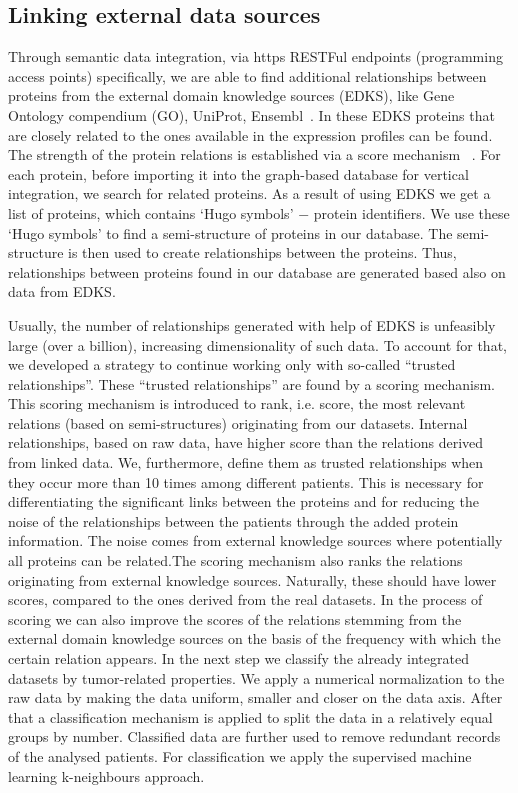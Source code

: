 \documentclass{bmcart}
\begin{document}
\subsection{Linking external data sources}

Through semantic data integration, via https RESTFul endpoints
(programming access points) specifically, we are able to find
additional relationships between proteins from the external domain
knowledge sources (EDKS), like Gene Ontology compendium (GO), UniProt,
Ensembl~\cite{11, 36, 37}. In these EDKS proteins that are closely related
to the ones available in the expression profiles can be found. The
strength of the protein relations is established via a score mechanism~\cite{11}
. For each protein, before importing it into the graph-based
database for vertical integration, we search for related proteins. As a
result of using EDKS we get a list of proteins, which contains
{\textquoteleft}Hugo symbols{\textquoteright} $-$ protein identifiers.
We use these {\textquoteleft}Hugo symbols{\textquoteright} to find a
semi-structure of proteins in our database. The semi-structure is then
used to create relationships between the proteins. Thus, relationships
between proteins found in our database are generated based also on data
from EDKS.

Usually, the number of relationships generated with help of EDKS is
unfeasibly large (over a billion), increasing dimensionality of such
data. To account for that,  we developed a strategy to continue working
only with so-called {\textquotedblleft}trusted
relationships{\textquotedblright}. These {\textquotedblleft}trusted
relationships{\textquotedblright} are found by a scoring mechanism.
This scoring mechanism is introduced to rank, i.e. score, the most
relevant relations (based on semi-structures) originating from our
datasets. Internal relationships, based on raw data, have higher score than the relations derived from linked data. We, furthermore, define them as trusted relationships when they occur more than 10 times among different patients. This is necessary for differentiating the significant links between the proteins and for reducing the noise of the relationships between the patients through the added protein information. The noise comes from external knowledge sources where potentially all proteins can be related.The scoring mechanism also ranks the relations originating from external knowledge sources. Naturally, these should have lower scores, compared to the ones derived from the real datasets. In the process of scoring we can also improve the scores of the relations stemming from the external domain knowledge sources on the basis of the frequency with which  the certain relation appears. In the next step we classify the already integrated datasets by tumor-related properties.
We apply a numerical normalization to the raw data by making the data uniform, smaller and closer on the data axis. After that a classification mechanism is applied to split the data in a relatively equal groups by number. Classified data are further used to
remove redundant records of the analysed patients. For classification
we apply the supervised machine learning k-neighbours approach.  
\end{document}
